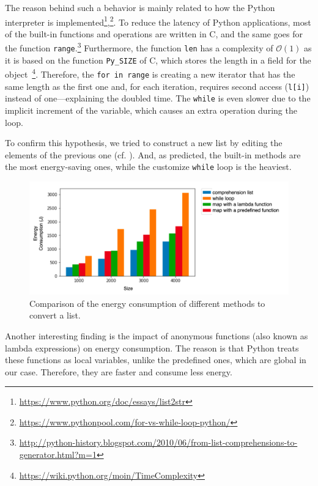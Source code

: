 The reason behind such a behavior is mainly related to how the Python interpreter is implemented\footnote{\url{https://www.python.org/doc/essays/list2str}},\footnote{\url{https://www.pythonpool.com/for-vs-while-loop-python/}}.
To reduce the latency of Python applications, most of the built-in functions and operations are written in C, and the same goes for the function \texttt{range}.\footnote{\url{ http://python-history.blogspot.com/2010/06/from-list-comprehensions-to-generator.html?m=1}}
Furthermore, the function \texttt{len} has a complexity of $\mathcal{O}(1)$ as it is based on the function \texttt{Py\_SIZE} of C, which stores the length in a field for the object~\footnote{\url{https://wiki.python.org/moin/TimeComplexity}}.
Therefore, the \texttt{for in range} is creating a new iterator that has the same length as the first one and, for each iteration, requires second access (\texttt{l[i]}) instead of one---explaining the doubled time.
The \texttt{while} is even slower due to the implicit increment of the variable, which causes an extra operation during the loop.

To confirm this hypothesis, we tried to construct a new list by editing the elements of the previous one (cf. ).
And, as predicted, the built-in methods are the most energy-saving ones, while the customize \texttt{while} loop is the heaviest.


\begin{figure}
    \centering
    \includegraphics[width=\linewidth]{imgs/python_treatemens}
    \caption{Comparison of the energy consumption of different methods to convert a list.}
    \label{fig:pythontreatement}
\end{figure}

Another interesting finding is the impact of anonymous functions (also known as lambda expressions) on energy consumption.
The reason is that Python treats these functions as local variables, unlike the predefined ones, which are global in our case.
Therefore, they are faster and consume less energy.

